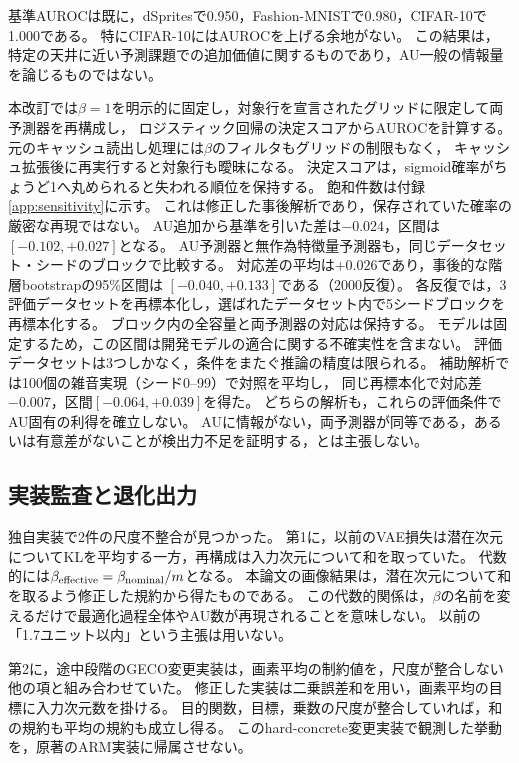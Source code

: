 \documentclass[11pt,a4paper]{ltjsarticle}
\begin{document}
基準AUROCは既に，dSpritesで0.950，Fashion-MNISTで0.980，CIFAR-10で1.000である。
特にCIFAR-10にはAUROCを上げる余地がない。
この結果は，特定の天井に近い予測課題での追加価値に関するものであり，AU一般の情報量を論じるものではない。

本改訂では$\beta=1$を明示的に固定し，対象行を宣言されたグリッドに限定して両予測器を再構成し，
ロジスティック回帰の決定スコアからAUROCを計算する。
元のキャッシュ読出し処理には$\beta$のフィルタもグリッドの制限もなく，
キャッシュ拡張後に再実行すると対象行も曖昧になる。
決定スコアは，sigmoid確率がちょうど1へ丸められると失われる順位を保持する。
飽和件数は付録\ref{app:sensitivity}に示す。
これは修正した事後解析であり，保存されていた確率の厳密な再現ではない。
AU追加から基準を引いた差は$-0.024$，区間は$[-0.102,+0.027]$となる。
AU予測器と無作為特徴量予測器も，同じデータセット・シードのブロックで比較する。
対応差の平均は$+0.026$であり，事後的な階層bootstrapの95\%区間は
$[-0.040,+0.133]$である（2000反復）。
各反復では，3評価データセットを再標本化し，選ばれたデータセット内で5シードブロックを再標本化する。
ブロック内の全容量と両予測器の対応は保持する。
モデルは固定するため，この区間は開発モデルの適合に関する不確実性を含まない。
評価データセットは3つしかなく，条件をまたぐ推論の精度は限られる。
補助解析では100個の雑音実現（シード0--99）で対照を平均し，
同じ再標本化で対応差$-0.007$，区間$[-0.064,+0.039]$を得た。
どちらの解析も，これらの評価条件でAU固有の利得を確立しない。
AUに情報がない，両予測器が同等である，あるいは有意差がないことが検出力不足を証明する，とは主張しない。

\subsection{実装監査と退化出力}
独自実装で2件の尺度不整合が見つかった。
第1に，以前のVAE損失は潜在次元についてKLを平均する一方，再構成は入力次元について和を取っていた。
代数的には$\beta_{\rm effective}=\beta_{\rm nominal}/m$となる。
本論文の画像結果は，潜在次元について和を取るよう修正した規約から得たものである。
この代数的関係は，$\beta$の名前を変えるだけで最適化過程全体やAU数が再現されることを意味しない。
以前の「1.7ユニット以内」という主張は用いない。

第2に，途中段階のGECO変更実装は，画素平均の制約値を，尺度が整合しない他の項と組み合わせていた。
修正した実装は二乗誤差和を用い，画素平均の目標に入力次元数を掛ける。
目的関数，目標，乗数の尺度が整合していれば，和の規約も平均の規約も成立し得る。
このhard-concrete変更実装で観測した挙動を，原著のARM実装に帰属させない。
\end{document}
